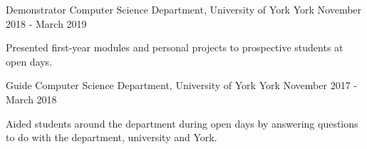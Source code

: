 
\begin{cventries}
  \cventry
    {Demonstrator} %
    {Computer Science Department, University of York} %
    {York} %
    {November 2018 - March 2019} %
    {
      \begin{cvitems} %
        \item {Presented first-year modules and personal projects to prospective students at open days.}
      \end{cvitems}
    }

  \cventry
    {Guide} %
    {Computer Science Department, University of York} %
    {York} %
    {November 2017 - March 2018} %
    {
      \begin{cvitems} %
        \item {Aided students around the department during open days by answering questions to do with the department, university and York.}
      \end{cvitems}
    }

\end{cventries}
